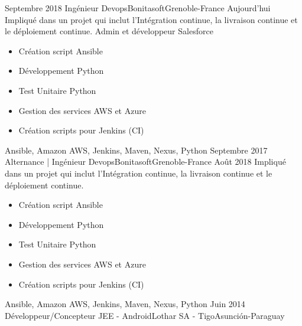 %
%
%
\begin{experiences}
  \projectexperiences
    {Septembre 2018}   {Ingénieur Devops}{Bonitasoft}{Grenoble-France}
    {Aujourd'hui}
                    {Impliqué dans un projet qui inclut l'Intégration continue, la livraison continue et le déploiement continue.
                    Admin et développeur Salesforce}
                    {
                      \begin{itemize}
                        \item Création script Ansible
                        \item Développement Python
                        \item Test Unitaire Python
                        \item Gestion des services AWS et Azure
                        \item Création scripts pour Jenkins (CI)
                      \end{itemize}
                    }
                    {Ansible, Amazon AWS, Jenkins, Maven, Nexus, Python}
  \emptySeparator
  \projectexperiences
    {Septembre 2017}   {Alternance | Ingénieur Devops}{Bonitasoft}{Grenoble-France}
    {Août 2018}
                    {Impliqué dans un projet qui inclut l'Intégration continue, la livraison continue et le déploiement continue.}
                    {
                      \begin{itemize}
                        \item Création script Ansible
                        \item Développement Python
                        \item Test Unitaire Python
                        \item Gestion des services AWS et Azure
                        \item Création scripts pour Jenkins (CI)
                      \end{itemize}
                    }
                    {Ansible, Amazon AWS, Jenkins, Maven, Nexus, Python}
  \emptySeparator
  \projectexperiences
    {Juin 2014}  {Développeur/Concepteur JEE - Android}{Lothar SA - Tigo}{Asunción-Paraguay}

\end{experiences}
